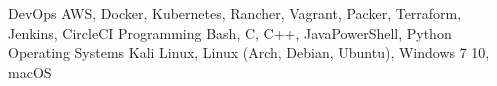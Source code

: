 

\begin{cvskills}

  \cvskill
    {DevOps} %
    {AWS, Docker, Kubernetes, Rancher, Vagrant, Packer, Terraform, Jenkins, CircleCI} %
  \cvskill
    {Programming} %
    {Bash, C, C++, JavaPowerShell, Python} %
  \cvskill
    {Operating Systems} %
    {Kali Linux, Linux (Arch, Debian, Ubuntu), Windows 7 10, macOS} %

\end{cvskills}
